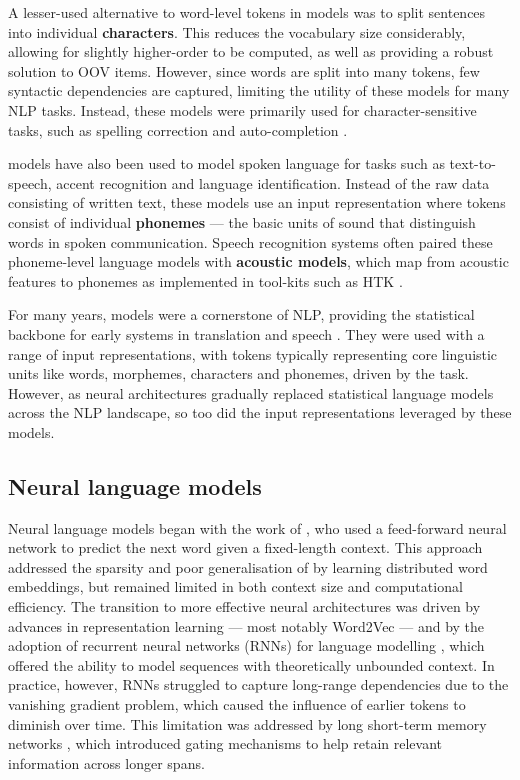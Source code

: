 A lesser-used alternative to word-level tokens in \ngram models was to split sentences into individual \textbf{characters}. This reduces the vocabulary size considerably, allowing for slightly higher-order \ngrams to be computed, as well as providing a robust solution to OOV items. However, since words are split into many tokens, few syntactic dependencies are captured, limiting the utility of these models for many NLP tasks. Instead, these models were primarily used for character-sensitive tasks, such as spelling correction and auto-completion \citep{cucerzan_spelling_2004}.

\ngram models have also been used to model spoken language for tasks such as text-to-speech, accent recognition and language identification. Instead of the raw data consisting of written text, these models use an input representation where tokens consist of individual \textbf{phonemes} --- the basic units of sound that distinguish words in spoken communication. Speech recognition systems often paired these phoneme-level language models with \textbf{acoustic models}, which map from acoustic features to phonemes as implemented in tool-kits such as HTK \citep{young2006htk}.

For many years, \ngram models were a cornerstone of NLP, providing the statistical backbone for early systems in translation and speech \citep{jurafsky2009speech}. They were used with a range of input representations, with tokens typically representing core linguistic units like words, morphemes, characters and phonemes, driven by the task. However, as neural architectures gradually replaced statistical language models across the NLP landscape, so too did the input representations leveraged by these models.

\subsection{Neural language models}

Neural language models began with the work of \citet{bengio2000neural}, who used a feed-forward neural network to predict the next word given a fixed-length context. This approach addressed the sparsity and poor generalisation of \ngram by learning distributed word embeddings, but remained limited in both context size and computational efficiency. The transition to more effective neural architectures was driven by advances in representation learning --- most notably Word2Vec \citep{mikolov_distributed_2013} --- and by the adoption of recurrent neural networks (RNNs) for language modelling \citep[RNNLMs;][]{mikolov2010recurrent}, which offered the ability to model sequences with theoretically unbounded context. In practice, however, RNNs struggled to capture long-range dependencies due to the vanishing gradient problem, which caused the influence of earlier tokens to diminish over time. This limitation was addressed by long short-term memory networks \citep[LSTMs;][]{sundermeyer2012lstm}, which introduced gating mechanisms to help retain relevant information across longer spans. 

